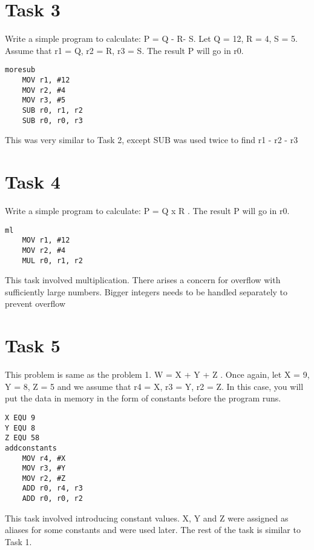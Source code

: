 \documentclass{article}
\begin{document}
\section{Task 3}
\begin{listing}[h]
Write a simple program to calculate: P = Q - R- S. Let Q = 12, R = 4, S = 5. Assume that
r1 = Q, r2 = R, r3 = S. The result P will go in r0.
\begin{verbatim}
moresub
	MOV r1, #12
	MOV r2, #4
	MOV r3, #5
	SUB r0, r1, r2
	SUB r0, r0, r3
\end{verbatim}
This was very similar to Task 2, except SUB was used twice to find r1 - r2 - r3
\end{listing}

\section{Task 4}
\begin{listing}[h]
Write a simple program to calculate: P = Q x R . The result P will go in r0.
\begin{verbatim}
ml
	MOV r1, #12
	MOV r2, #4
	MUL r0, r1, r2
\end{verbatim}
This task involved multiplication. There arises a concern for overflow with sufficiently large numbers. Bigger integers needs to be handled separately to prevent overflow
\end{listing}

\section{Task 5}
\begin{listing}[h]
This problem is same as the problem 1. W = X + Y + Z . Once again, let X = 9, Y = 8,
Z = 5 and we assume that r4 = X, r3 = Y, r2 = Z. In this case, you will put the data in
memory in the form of constants before the program runs.
\begin{verbatim}
X EQU 9
Y EQU 8
Z EQU 58
addconstants
	MOV r4, #X
	MOV r3, #Y
	MOV r2, #Z
	ADD r0, r4, r3
	ADD r0, r0, r2
\end{verbatim}
This task involved introducing constant values. X, Y and Z were assigned as aliases for some constants and were used later. The rest of the task is similar to Task 1.
\end{listing}
\end{document}
